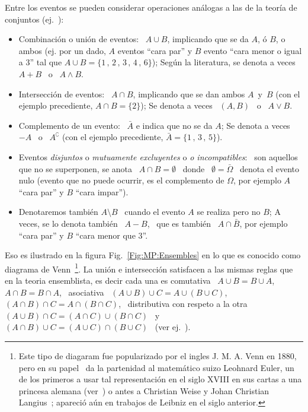 Entre  los eventos  se  pueden considerar  operaciones  an\'alogas a  las de  la
teor\'ia de  conjuntos (ej.~\cite{Spi76,  Bre88, ManWol95, Sie75,  Sie76, Bor98,
  Bor09}):
%
\begin{itemize}
\item Combinaci\'on  o uni\'on de  eventos: \ $A  \cup B$, implicando que  se da
  $A$, \'o $B$, o ambos (ej. por  un dado, $A$ eventos ``cara par'' y $B$ evento
  ``cara menor o igual a 3'' tal que $A \cup B = \{1 \, , \, 2 \, , \, 3 \, , \,
  4 \,  , \, 6\}$); Seg\'un la  literatura, se denota a  veces \ $A+B$ \  o \ $A
  \wedge B$.
%
\item  Intersecci\'on de  eventos:  \ $A\cap  B$,  implicando que  se dan  ambos
  $A$~y~$B$ (con  el ejemplo precediente,  $A \cap  B = \{  2 \}$); Se  denota a
  veces \ $(A,B)$ \ o \ $A \vee B$.
%
\item Complemento de un evento: \ $\bar{A}$ e indica que no se da $A$; Se denota
  a veces \ $-A$  \ o \ $A^\complement$ (con el ejemplo precediente, $\bar{A}  = \{ 1 \, ,
  \, 3 \, , \, 5 \}$).
%
\item  Eventos  {\it  disjuntos}  o   {\it  mutuamente  excluyentes}  o  {\it  o
    incompatibles}: \ son aquellos que no se  superponen, se anota \ $A \cap B =
  \emptyset$  \ donde  \  $\emptyset =  \bar{\Omega}$  \ denota  el evento  nulo
  (evento que no  puede ocurrir, es el complemento de  $\Omega$, por ejemplo $A$
  ``cara par'' y $B$ ``cara impar'').
%
\item Denotaremos  tambi\'en $A \setminus B$  \ cuando el evento  $A$ se realiza
  pero no $B$; A veces, se lo denota  tambi\'en \ $A-B$, \ que es tambi\'en \ $A
  \cap \bar{B}$, por ejemplo ``cara par'' y $B$ ``cara menor que 3''.
\end{itemize}
%
\noindent Eso es ilustrado en la figura Fig.~\ref{Fig:MP:Ensembles} en lo que es
conocido como diagrama de  Venn~\footnote{Este tipo de diagaram fue popularizado
  por el ingles  J.  M.  A.  Venn  en 1880, pero en su  papel~\cite{Ven80} da la
  partenidad al matem\'atico suizo Leohnard Euler, un de los primeros a usar tal
  representaci\'on  en el  siglo  XVIII en  sus  cartas a  una princesa  alemana
  (ver~\cite[L~102-105, pp.~95-126]{Eul68})  o antes  a Christian Weise  y Johan
  Christian Langius~\cite{Lan12}; apareci\'o a\'un  en trabajos de Leibniz en el
  siglo anterior.\label{Foot:MP:Euler}}.  La uni\'on e intersecci\'on satisfacen
a  las  mismas reglas  que  en  la teoria  ensemblista,  es  decir  cada una  es
comutativa \ $A \cup B = B \cup A$, \  $A \cap B = B \cap A$, \ asociativa \ $(A
\cup B) \cup C = A \cup (B \cup C)$,  \ $(A \cap B) \cap C = A \cap (B \cap C)$,
\ distributiva con respeto a  la otra \ $(A \cup B) \cap C =  (A \cap C) \cup (B
\cap  C)$ \  y \  $(A \cap  B) \cup  C =  (A \cup  C) \cap  (B \cup  C)$  \ (ver
ej.~\cite{Jef48,  Jef73,  Hal50,  Fel71,  Bre88, ManWol95,  IbaPar97,  LehCas98,
  AthLah06, Coh13, HogMck13}).

